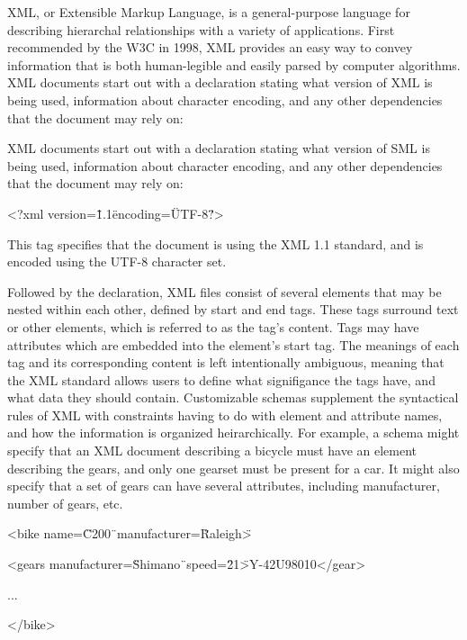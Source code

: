 \documentclass[a4paper,12pt]{report}
\begin{document}
XML, or Extensible Markup Language, is a general-purpose language for describing hierarchal relationships with a variety of applications. 
First recommended by the W3C in 1998, XML provides an easy way to convey information that is both human-legible and easily parsed by computer algorithms. 
XML documents start out with a declaration stating what version of XML is being used, information about character encoding, and any other dependencies that the document may rely on:

XML documents start out with a declaration stating what version of SML is being used, information about character encoding, and any other dependencies that the document may rely on:

<?xml version=\"1.1\" encoding=\"UTF-8\"?>

This tag specifies that the document is using the XML 1.1 standard, and is encoded using the UTF-8 character set.

Followed by the declaration, XML files consist of several elements that may be nested within each other, defined by start and end tags.
These tags surround text or other elements, which is referred to as the tag's content.
Tags may have attributes which are embedded into the element's start tag. 
The meanings of each tag and its corresponding content is left intentionally ambiguous, meaning that the XML standard allows users to define what signifigance the tags have, and what data they should contain. 
Customizable schemas supplement the syntactical rules of XML with constraints having to do with element and attribute names, and how the information is organized heirarchically. 
For example, a schema might specify that an XML document describing a bicycle must have an element describing the gears, and only one gearset must be present for a car. 
It might also specify that a set of gears can have several attributes, including manufacturer, number of gears, etc. 


<bike name=\"C200\"\ manufacturer=\"Raleigh\">

<gears manufacturer=\"Shimano\"\ speed=\"21\">Y-42U98010</gear>

...

</bike>
\end{document}
